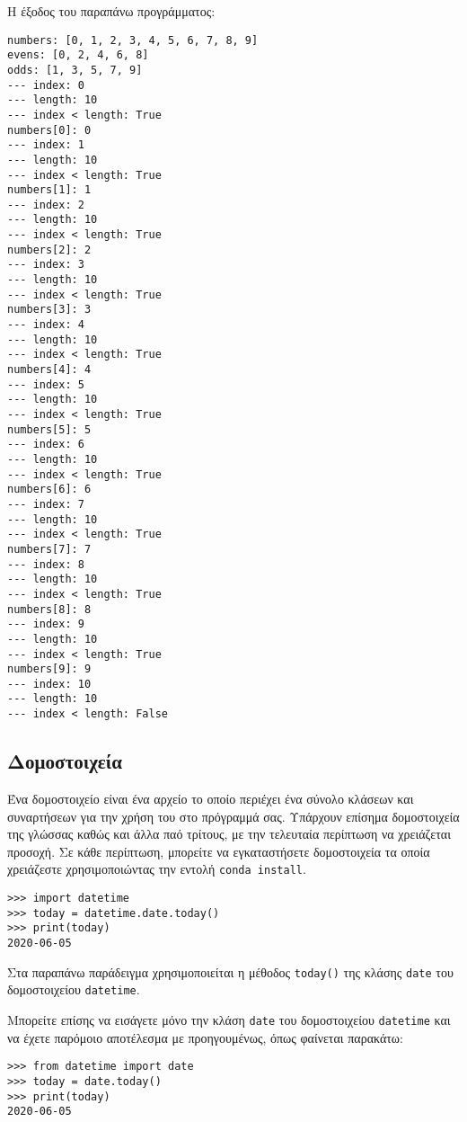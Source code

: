 \documentclass[14pt]{extreport}
\begin{document}
Η έξοδος του παραπάνω προγράμματος:

\begin{lstlisting}[language={}]
numbers: [0, 1, 2, 3, 4, 5, 6, 7, 8, 9]
evens: [0, 2, 4, 6, 8]
odds: [1, 3, 5, 7, 9]
--- index: 0
--- length: 10
--- index < length: True
numbers[0]: 0
--- index: 1
--- length: 10
--- index < length: True
numbers[1]: 1
--- index: 2
--- length: 10
--- index < length: True
numbers[2]: 2
--- index: 3
--- length: 10
--- index < length: True
numbers[3]: 3
--- index: 4
--- length: 10
--- index < length: True
numbers[4]: 4
--- index: 5
--- length: 10
--- index < length: True
numbers[5]: 5
--- index: 6
--- length: 10
--- index < length: True
numbers[6]: 6
--- index: 7
--- length: 10
--- index < length: True
numbers[7]: 7
--- index: 8
--- length: 10
--- index < length: True
numbers[8]: 8
--- index: 9
--- length: 10
--- index < length: True
numbers[9]: 9
--- index: 10
--- length: 10
--- index < length: False
\end{lstlisting}


\subsection{Δομοστοιχεία}

Ένα δομοστοιχείο είναι ένα αρχείο το οποίο περιέχει ένα σύνολο κλάσεων  και συναρτήσεων για την χρήση του στο πρόγραμμά σας. Υπάρχουν επίσημα δομοστοιχεία της γλώσσας καθώς και άλλα παό τρίτους, με την τελευταία περίπτωση να χρειάζεται προσοχή. Σε κάθε περίπτωση, μπορείτε να εγκαταστήσετε δομοστοιχεία τα οποία χρειάζεστε χρησιμοποιώντας την εντολή \lstinline{conda install}.

\begin{lstlisting}
>>> import datetime
>>> today = datetime.date.today()
>>> print(today)
2020-06-05
\end{lstlisting}

Στα παραπάνω παράδειγμα χρησιμοποιείται η μέθοδος \lstinline{today()}  της κλάσης \lstinline{date} του δομοστοιχείου \lstinline{datetime}.

Μπορείτε επίσης να εισάγετε μόνο την κλάση \lstinline{date} του δομοστοιχείου \lstinline{datetime} και να έχετε παρόμοιο αποτέλεσμα με προηγουμένως, όπως φαίνεται παρακάτω:

\begin{lstlisting}
>>> from datetime import date
>>> today = date.today()
>>> print(today)
2020-06-05
\end{lstlisting}

\newpage
\end{document}
